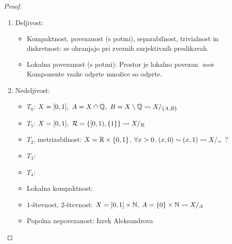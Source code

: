 \begin{proof} \
    \begin{enumerate}
        \item Deljivost:
        \begin{itemize}
            \item Kompaktnost, povezanost (s potmi), separabilnost, trivialnost in diskretnost: se ohranjajo pri zveznih surjektivnih preslikavah.
            \item Lokalna povezanost (s potmi): Prostor je lokalno povezan \(\iff\) Komponente vsake odprte množice so odprte. 
        \end{itemize}
        \item Nedeljivost:
        \begin{itemize}
            \item \(T_0\): \(X=[0,1], \ A = X \cap \mathbb{Q}, \ B = X \setminus \mathbb{Q} \leadsto X/_{\left\{A, B\right\}}\)
            \item \(T_1\): \(X=[0,1], \ \mathcal{R} = \left\{[0,1), \left\{1\right\}\right\} \leadsto X/_\mathcal{R}\)
            \item \(T_2\), metrizabilnost: \(X = \mathbb{R} \times \left\{0,1\right\}\), \(\forall x > 0 \,.\,(x, 0) \sim (x, 1) \leadsto X/_\sim\) ? 
            \item \(T_3\): \todo{}
            \item \(T_4\): \todo{}
            \item Lokalna kompaktnost: \todo{}
            \item \(1\)-števnost, \(2\)-števnost: \(X=[0,1] \times \mathbb{N}\), \(A = \left\{0\right\} \times \mathbb{N} \leadsto X/_A\)
            \item Popolna nepovezanost: Izrek Aleksandrova \qedhere
        \end{itemize}
    \end{enumerate}    
\end{proof}